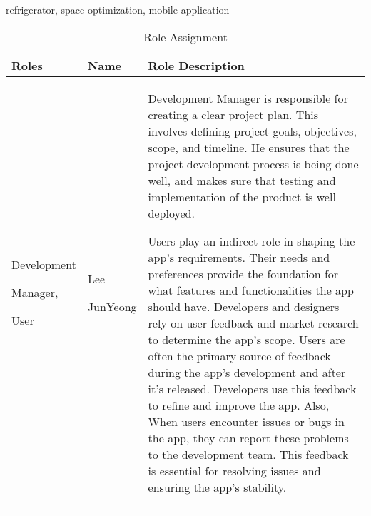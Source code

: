 \documentclass[conference]{IEEEtran}
\begin{document}
\begin{IEEEkeywords}
refrigerator, space optimization, mobile application
\end{IEEEkeywords}

\begin{table}[ht]
\caption{Role Assignment}
\begin{tabular}{| p{1.7cm}|p{1.5cm}|p{4.3cm} |}

\hline
Roles & Name & Role Description\\
\hline
Development \par Manager, \par User 
& Lee \par JunYeong 
& Development Manager is responsible for creating a clear project plan. This involves defining project goals, objectives, scope, and timeline. He ensures that the project development process is being done well, and makes sure that testing and implementation of the product is well deployed. \par
Users play an indirect role in shaping the app's requirements. Their needs and preferences provide the foundation for what features and functionalities the app should have. Developers and designers rely on user feedback and market research to determine the app's scope. Users are often the primary source of feedback during the app's development and after it's released. Developers use this feedback to refine and improve the app. Also, When users encounter issues or bugs in the app, they can report these problems to the development team. This feedback is essential for resolving issues and ensuring the app's stability.\\
\hline
\end{tabular}
\end{table}
\end{document}
